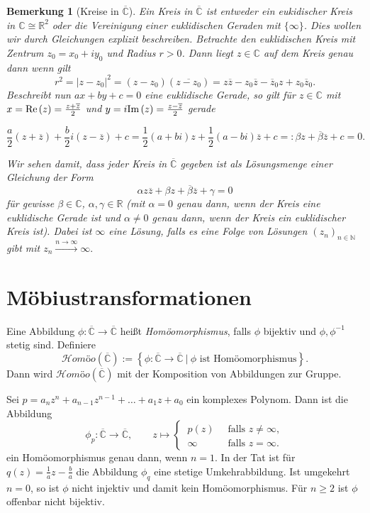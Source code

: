 \documentclass[11pt]{book}
\numberwithin{dummy}{section}
\newtheorem{remark}[theorem]{Bemerkung}
\theoremstyle{nonumberbreak}
\newenvironment{ex}[1][]{\ifthenelse{\equal{#1}{}}{\example}{\example[#1]}\rm}{\endexample}
\newcommand{\Imm}{\mathrm{Im}\hspace{1.5pt}}
\newcommand{\Ree}{\mathrm{Re}\hspace{1.5pt}}
\newcommand{\C}{\mathbb{C}}
\newcommand{\N}{\mathbb{N}}
\newcommand{\CC}{\overline{\mathbb{C}}}
\newcommand{\la}{\longrightarrow}
\newcommand{\homoecc}{\mathcal{H}\textit{omöo}(\CC)}
\begin{document}
\begin{spacing}{1.4}
\begin{remark}[Kreise in $\CC$]
Ein Kreis in $\CC$ ist entweder ein eukidischer Kreis in $\C \cong \mathbb{R}^2$ oder die Vereinigung einer euklidischen Geraden mit $\{\infty\}$. Dies wollen wir durch Gleichungen explizit beschreiben.
Betrachte den euklidischen Kreis mit Zentrum $z_0=x_0 + i y_0$ und Radius $r >0$. Dann liegt $z \in \C$ auf dem Kreis genau dann wenn gilt 
$$r^2= \vert z-z_0\vert^2 = (z-z_0)(\overline{z-z_0}) = z\overline{z} - z_0\overline{z}- \overline{z}_0z + z_0 \overline{z}_0.$$
Beschreibt nun $ax+by+c=0$ eine euklidische Gerade, so gilt für $z \in \C$ mit $x= \Ree(z)= \frac{z+\overline{z}}{2}$ und $y=i\Imm(z)=\frac{z-\overline{z}}{2}$ gerade

$$\frac{a}{2}(z + \overline{z}) + \frac{b}{2} i (z-\overline{z}) + c=\frac{1}{2}(a+bi)z + \frac{1}{2}(a-bi)\overline{z} + c =: \beta z + \overline{\beta} \overline{z} + c =0.$$

Wir sehen damit, dass jeder Kreis in $\CC$ gegeben ist als Lösungsmenge einer Gleichung der Form 
$$\alpha z \overline{z} + \beta z + \overline{\beta} \overline{z} + \gamma = 0$$
für gewisse $\beta \in \C$, $\alpha, \gamma \in \mathbb{R}$ (mit $\alpha=0$ genau dann, wenn der Kreis eine euklidische Gerade ist und $\alpha\neq0$ genau dann, wenn der Kreis ein euklidischer Kreis ist). Dabei ist $\infty$ eine Lösung, falls es eine Folge von Lösungen $(z_n)_{n \in \N}$ gibt mit $z_n \xrightarrow{n \to \infty} \infty.$

\end{remark}





\section{Möbiustransformationen} %




Eine Abbildung $\phi: \CC \la \CC$ heißt \textit{Homöomorphismus}, falls $\phi$ bijektiv und $\phi, \phi^{-1}$ stetig sind. Definiere
$$\homoecc := \left\{ \phi: \CC \la \CC \ \vert \ \phi \textrm{ ist Homöomorphismus} \right\}.$$
Dann wird $\homoecc$ mit der Komposition von Abbildungen zur Gruppe.

\hypertarget{beispieleinszweieins}{}
\begin{ex} Sei $p=a_nz^n+a_{n-1}z^{n-1} + \ldots + a_1z + a_0$ ein komplexes Polynom. Dann ist die Abbildung
$$\phi_p: \CC \la \CC, \qquad z \mapsto \begin{cases} \ p(z) & \ \textrm{ falls } z \neq \infty, \\ \ \infty & \ \textrm{ falls } z=\infty. \end{cases}$$
ein Homöomorphismus genau dann, wenn $n=1$. In der Tat ist für $q(z)=\frac{1}{a}z-\frac{b}{a}$ die Abbildung $\phi_q$ eine stetige Umkehrabbildung. Ist umgekehrt $n=0$, so ist $\phi$ nicht injektiv und damit kein Homöomorphismus. Für $n \geqslant 2$ ist $\phi$ offenbar nicht bijektiv.
\end{ex}


\end{spacing}
\end{document}
